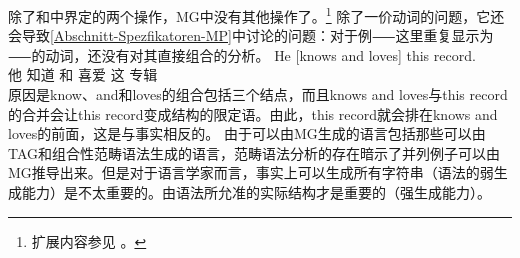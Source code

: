 除了和中界定的两个操作，MG中没有其他操作了。\footnote{%
扩展内容参见 。
}
除了一价动词的问题，它还会导致\ref{Abschnitt-Spezfikatoren-MP}中讨论的问题：对于例⸺这里重复显示为⸺的动词，还没有对其直接组合的分析。
\ea
\label{ex-he-knows-and-loves-this-record-MP-zwei}
\gll He [knows and loves] this record.\\
     他 \spacebr{}知道 和 喜爱 这 专辑\\
\z
原因是know、and和loves的组合包括三个结点，而且knows and loves与this record的合并会让this record变成结构的限定语。由此，this record就会排在knows and loves的前面，这是与事实相反的。
由于可以由MG生成的语言包括那些可以由TAG\indextag 和组合性范畴语法\indexcg \citep{Michaelis2001a-u}生成的语言，范畴语法分析的存在暗示了并列例子可以由MG推导出来。但是对于语言学家而言，事实上可以生成所有字符串（语法的弱生成能力）是不太重要的。由语法所允准的实际结构才是重要的（强生成能力）。

